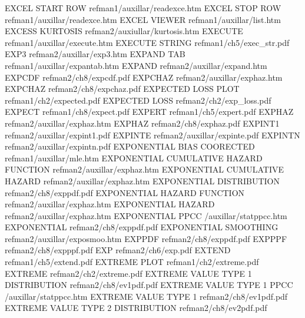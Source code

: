 EXCEL START ROW                         refman1/auxillar/readexce.htm
EXCEL STOP ROW                          refman1/auxillar/readexce.htm
EXCEL VIEWER                            refman1/auxillar/list.htm
EXCESS KURTOSIS                         refman2/auxiullar/kurtosis.htm
EXECUTE                                 refman1/auxillar/execute.htm
EXECUTE STRING                          refman1/ch5/exec_str.pdf
EXP3                                    refman2/auxillar/exp3.htm
EXPAND TAB                              refman1/auxillar/expantab.htm
EXPAND                                  refman2/auxillar/expand.htm
EXPCDF                                  refman2/ch8/expcdf.pdf
EXPCHAZ                                 refman2/auxillar/exphaz.htm
EXPCHAZ                                 refman2/ch8/expchaz.pdf
EXPECTED LOSS PLOT                      refman1/ch2/expected.pdf
EXPECTED LOSS                           refman2/ch2/exp_loss.pdf
EXPECT                                  refman1/ch8/expect.pdf
EXPERT                                  refman1/ch5/expert.pdf
EXPHAZ                                  refman2/auxillar/exphaz.htm
EXPHAZ                                  refman2/ch8/exphaz.pdf
EXPINT1                                 refman2/auxillar/expint1.pdf
EXPINTE                                 refman2/auxillar/expinte.pdf
EXPINTN                                 refman2/auxillar/expintn.pdf
EXPONENTIAL BIAS COORECTED              refman1/auxillar/mle.htm
EXPONENTIAL CUMULATIVE HAZARD FUNCTION  refman2/auxillar/exphaz.htm
EXPONENTIAL CUMULATIVE HAZARD           refman2/auxillar/exphaz.htm
EXPONENTIAL DISTRIBUTION                refman2/ch8/exppdf.pdf
EXPONENTIAL HAZARD FUNCTION             refman2/auxillar/exphaz.htm
EXPONENTIAL HAZARD                      refman2/auxillar/exphaz.htm
EXPONENTIAL PPCC                        /auxillar/statppcc.htm
EXPONENTIAL                             refman2/ch8/exppdf.pdf
EXPONENTIAL SMOOTHING                   refman2/auxillar/exposmoo.htm
EXPPDF                                  refman2/ch8/exppdf.pdf
EXPPPF                                  refman2/ch8/expppf.pdf
EXP                                     refman2/ch6/exp.pdf
EXTEND                                  refman1/ch5/extend.pdf
EXTREME PLOT                            refman1/ch2/extreme.pdf
EXTREME                                 refman2/ch2/extreme.pdf
EXTREME VALUE TYPE 1 DISTRIBUTION       refman2/ch8/ev1pdf.pdf
EXTREME VALUE TYPE 1 PPCC               /auxillar/statppcc.htm
EXTREME VALUE TYPE 1                    refman2/ch8/ev1pdf.pdf
EXTREME VALUE TYPE 2 DISTRIBUTION       refman2/ch8/ev2pdf.pdf
